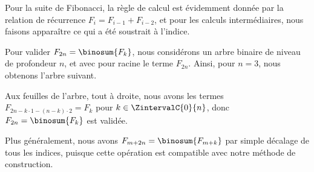 Pour la suite de Fibonacci, la règle de calcul est évidemment donnée par la relation de récurrence $F_{i} = F_{i-1} + F_{i-2}$, et pour les calculs intermédiaires, nous faisons apparaître ce qui a été soustrait à l'indice.

%
            {\intertree}{}

Pour valider $F_{2n} = \binosum{F_k}$, nous considérons un arbre binaire de niveau de profondeur $n$, et avec pour racine le terme $F_{2n}$.
Ainsi, pour $n=3$, nous obtenons l'arbre suivant.


Aux feuilles de l'arbre, tout à droite, nous avons les termes 
$F_{2n - k\cdot1 - (n-k)\cdot2} = F_k$
pour $k \in \ZintervalC{0}{n}$,
donc
$F_{2n} = \binosum{F_k}$ est validée.

\begin{remark}
	Plus généralement, nous avons
	$F_{m+2n} = \binosum{F_{m+k}}$
	par simple décalage de tous les indices,
	puisque cette opération est compatible avec notre méthode de construction.
\end{remark}
